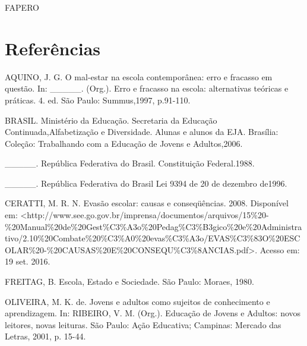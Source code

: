 \documentclass[article,12pt,onesidea,4paper,english,brazil]{abntex2}
\begin{document}
	FAPERO
	
	\section*{Referências}
	
	\sloppy
	
	\noindent AQUINO, J. G. O mal-estar na escola contemporânea: erro e fracasso em questão. In: \_\_\_\_\_. (Org.). Erro e fracasso na escola: alternativas teóricas e práticas. 4. ed. São Paulo: Summus,1997, p.91-110.
	
	\noindent BRASIL. Ministério da Educação. Secretaria da Educação Continuada,Alfabetização e Diversidade. Alunas e alunos da EJA. Brasília: Coleção: Trabalhando com a Educação de Jovens e Adultos,2006.
		
	\noindent \_\_\_\_\_. República Federativa do Brasil. Constituição Federal.1988.
	
	\noindent \_\_\_\_\_. República Federativa do Brasil Lei 9394 de 20 de dezembro de1996.
	
	\noindent CERATTI, M. R. N. Evasão escolar: causas e conseqüências. 2008. Disponível em:
	<http://www.see.go.gov.br/imprensa/documentos/arquivos/15\%20-
	\%20Manual\%20de\%20Gest\%C3\%A3o\%20Pedag\%C3\%B3gico\%20e\%20Administra tivo/2.10\%20Combate\%20\%C3\%A0\%20evas\%C3\%A3o/EVAS\%C3\%83O\%20ESC OLAR\%20-\%20CAUSAS\%20E\%20CONSEQU\%C3\%8ANCIAS.pdf>. Acesso em: 19
	set. 2016.
	
	\noindent FREITAG, B. Escola, Estado e Sociedade. São Paulo: Moraes, 1980.
	
	\noindent OLIVEIRA, M. K. de. Jovens e adultos como sujeitos de conhecimento e aprendizagem. In: RIBEIRO, V. M. (Org.). Educação de Jovens e Adultos: novos leitores, novas leituras. São Paulo: Ação Educativa; Campinas: Mercado das Letras, 2001, p. 15-44.
	
\end{document}
